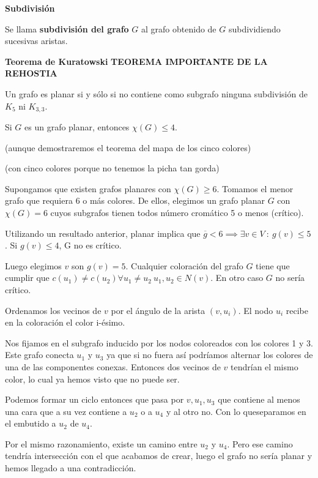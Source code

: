 \documentclass[openany]{book}
\begin{document}
\begin{definition}{ \color{turquoise} \textbf{Subdivisión}}

  Se llama \textbf{subdivisión del grafo} $G$ al grafo obtenido de $G$ subdividiendo sucesivas aristas.
\end{definition}

\begin{theorem}
  { \color{turquoise} \textbf{Teorema de Kuratowski}} {\color{red} \tiny \textbf{TEOREMA IMPORTANTE DE LA REHOSTIA}}

  Un grafo es planar si y sólo si no contiene como subgrafo ninguna subdivisión de $K_{5}$ ni $K_{3,3}$.

\end{theorem}

\begin{theorem}
  Si $G$ es un grafo planar, entonces $\chi(G) \leq 4$.

  (aunque demostraremos el teorema del mapa de los cinco colores)

\end{theorem}

\begin{demonstration}
  \begin{flushright}
    (con cinco colores porque no tenemos la picha tan gorda)
  \end{flushright}

  Supongamos que existen grafos planares con $\chi(G) \geq 6$. Tomamos el menor grafo que requiera 6 o más colores. De ellos, elegimos un grafo planar $G$ con $\chi(G)=6$ cuyos subgrafos tienen todos número cromático 5 o menos (crítico).

  Utilizando un resultado anterior, planar implica que $\overline{g} < 6 \implies \exists v \in V \ : \ g(v) \leq 5$. Si $g(v) \leq 4$, G no es crítico.

  Luego elegimos $v$ son $ g(v) = 5 $. Cualquier coloración del grafo $ G $ tiene que cumplir que $ c(u_1) \ne c(u_2) \forall u_1 \ne u_2\ u_1,u_2 \in N(v)  $. En otro caso $ G $ no sería crítico.

  Ordenamos los vecinos de $v$ por el ángulo de la arista $(v, u_i)$. El nodo $ u_i $ recibe en la coloración el color i-ésimo.

  Nos fijamos en el subgrafo inducido por los nodos coloreados con los colores 1 y 3. Este grafo conecta $u_1$ y $u_3$ ya que si no fuera así podríamos alternar los colores de una de las componentes conexas. Entonces dos vecinos de $ v $ tendrían el mismo color, lo cual ya hemos visto que no puede ser.

  Podemos formar un ciclo entonces  que pasa por $v,u_1,u_3$ que contiene al menos una cara que a su vez contiene a $ u_2 $ o a $u_4$ y al otro no. Con lo queseparamos en el embutido a $ u_2 $ de $ u_4 $.

  Por el mismo razonamiento, existe un camino entre $ u_2$ y $ u_4 $. Pero ese camino tendría intersección con el que acabamos de crear, luego el grafo no sería planar y hemos llegado a una contradicción.

\end{demonstration}
\end{document}
